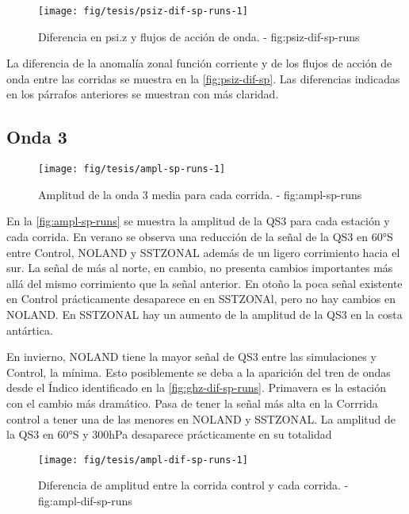 \documentclass[spanish,a4paper,12p]{book}
\begin{document}
\begin{figure*}
\texttt{[image: fig/tesis/psiz-dif-sp-runs-1]} \caption{Diferencia en psi.z y flujos de acción de onda. - fig:psiz-dif-sp-runs}\label{fig:psiz-dif-sp-runs}
\end{figure*}

La diferencia de la anomalía zonal función corriente y de los flujos de
acción de onda entre las corridas se muestra en la
\autoref{fig:psiz-dif-sp}. Las diferencias indicadas en los párrafos
anteriores se muestran con más claridad.


\subsection{Onda 3}\label{onda-3-2}

\begin{figure*}
\texttt{[image: fig/tesis/ampl-sp-runs-1]} \caption{Amplitud de la onda 3 media para cada corrida. - fig:ampl-sp-runs}\label{fig:ampl-sp-runs}
\end{figure*}

En la \autoref{fig:ampl-sp-runs} se muestra la amplitud de la QS3 para
cada estación y cada corrida. En verano se observa una reducción de la
señal de la QS3 en 60°S entre Control, NOLAND y SSTZONAL además de un
ligero corrimiento hacia el sur. La señal de más al norte, en cambio, no
presenta cambios importantes más allá del mismo corrimiento que la señal
anterior. En otoño la poca señal existente en Control prácticamente
desaparece en en SSTZONAl, pero no hay cambios en NOLAND. En SSTZONAL
hay un aumento de la amplitud de la QS3 en la costa antártica.

En invierno, NOLAND tiene la mayor señal de QS3 entre las simulaciones y
Control, la mínima. Esto posiblemente se deba a la aparición del tren de
ondas desde el Índico identificado en la \autoref{fig:ghz-dif-sp-runs}.
Primavera es la estación con el cambio más dramático. Pasa de tener la
señal más alta en la Corrrida control a tener una de las menores en
NOLAND y SSTZONAL. La amplitud de la QS3 en 60°S y 300hPa desaparece
prácticamente en su totalidad


\begin{figure*}
\texttt{[image: fig/tesis/ampl-dif-sp-runs-1]} \caption{Diferencia de amplitud entre la corrida control y cada corrida. - fig:ampl-dif-sp-runs}\label{fig:ampl-dif-sp-runs}
\end{figure*}
\end{document}
